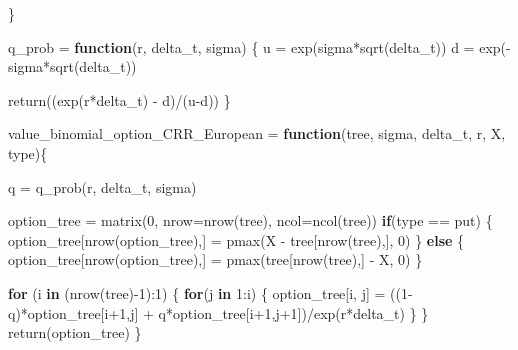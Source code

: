 \documentclass[
]{article}
\newenvironment{Shaded}{\begin{snugshade}}{\end{snugshade}}
\newcommand{\AttributeTok}[1]{\textcolor[rgb]{0.77,0.63,0.00}{#1}}
\newcommand{\ControlFlowTok}[1]{\textcolor[rgb]{0.13,0.29,0.53}{\textbf{#1}}}
\newcommand{\DecValTok}[1]{\textcolor[rgb]{0.00,0.00,0.81}{#1}}
\newcommand{\FunctionTok}[1]{\textcolor[rgb]{0.00,0.00,0.00}{#1}}
\newcommand{\NormalTok}[1]{#1}
\newcommand{\OtherTok}[1]{\textcolor[rgb]{0.56,0.35,0.01}{#1}}
\newcommand{\SpecialCharTok}[1]{\textcolor[rgb]{0.00,0.00,0.00}{#1}}
\newcommand{\StringTok}[1]{\textcolor[rgb]{0.31,0.60,0.02}{#1}}
\begin{document}
\begin{Shaded}
\begin{Highlighting}[]
\NormalTok{\}}

\NormalTok{q\_prob }\OtherTok{=} \ControlFlowTok{function}\NormalTok{(r, delta\_t, sigma) \{}
\NormalTok{  u }\OtherTok{=} \FunctionTok{exp}\NormalTok{(sigma}\SpecialCharTok{*}\FunctionTok{sqrt}\NormalTok{(delta\_t))}
\NormalTok{  d }\OtherTok{=} \FunctionTok{exp}\NormalTok{(}\SpecialCharTok{{-}}\NormalTok{sigma}\SpecialCharTok{*}\FunctionTok{sqrt}\NormalTok{(delta\_t))}
  
  \FunctionTok{return}\NormalTok{((}\FunctionTok{exp}\NormalTok{(r}\SpecialCharTok{*}\NormalTok{delta\_t) }\SpecialCharTok{{-}}\NormalTok{ d)}\SpecialCharTok{/}\NormalTok{(u}\SpecialCharTok{{-}}\NormalTok{d))}
\NormalTok{\}}


\NormalTok{value\_binomial\_option\_CRR\_European }\OtherTok{=} \ControlFlowTok{function}\NormalTok{(tree, sigma, delta\_t, r, X, type)\{}
  
\NormalTok{  q }\OtherTok{=} \FunctionTok{q\_prob}\NormalTok{(r, delta\_t, sigma)}
  
\NormalTok{  option\_tree }\OtherTok{=} \FunctionTok{matrix}\NormalTok{(}\DecValTok{0}\NormalTok{, }\AttributeTok{nrow=}\FunctionTok{nrow}\NormalTok{(tree), }\AttributeTok{ncol=}\FunctionTok{ncol}\NormalTok{(tree))}
  \ControlFlowTok{if}\NormalTok{(type }\SpecialCharTok{==} \StringTok{\textquotesingle{}put\textquotesingle{}}\NormalTok{) \{}
\NormalTok{    option\_tree[}\FunctionTok{nrow}\NormalTok{(option\_tree),] }\OtherTok{=} \FunctionTok{pmax}\NormalTok{(X }\SpecialCharTok{{-}}\NormalTok{ tree[}\FunctionTok{nrow}\NormalTok{(tree),], }\DecValTok{0}\NormalTok{)}
\NormalTok{  \} }\ControlFlowTok{else}\NormalTok{ \{}
\NormalTok{    option\_tree[}\FunctionTok{nrow}\NormalTok{(option\_tree),] }\OtherTok{=} \FunctionTok{pmax}\NormalTok{(tree[}\FunctionTok{nrow}\NormalTok{(tree),] }\SpecialCharTok{{-}}\NormalTok{ X, }\DecValTok{0}\NormalTok{)}
\NormalTok{  \}}
  
  \ControlFlowTok{for}\NormalTok{ (i }\ControlFlowTok{in}\NormalTok{ (}\FunctionTok{nrow}\NormalTok{(tree)}\SpecialCharTok{{-}}\DecValTok{1}\NormalTok{)}\SpecialCharTok{:}\DecValTok{1}\NormalTok{) \{}
    \ControlFlowTok{for}\NormalTok{(j }\ControlFlowTok{in} \DecValTok{1}\SpecialCharTok{:}\NormalTok{i) \{}
\NormalTok{      option\_tree[i, j] }\OtherTok{=}\NormalTok{ ((}\DecValTok{1}\SpecialCharTok{{-}}\NormalTok{q)}\SpecialCharTok{*}\NormalTok{option\_tree[i}\SpecialCharTok{+}\DecValTok{1}\NormalTok{,j] }\SpecialCharTok{+}\NormalTok{ q}\SpecialCharTok{*}\NormalTok{option\_tree[i}\SpecialCharTok{+}\DecValTok{1}\NormalTok{,j}\SpecialCharTok{+}\DecValTok{1}\NormalTok{])}\SpecialCharTok{/}\FunctionTok{exp}\NormalTok{(r}\SpecialCharTok{*}\NormalTok{delta\_t)}
\NormalTok{    \}}
\NormalTok{  \}}
  \FunctionTok{return}\NormalTok{(option\_tree)}
\NormalTok{\}}


\end{Highlighting}
\end{Shaded}
\end{document}
